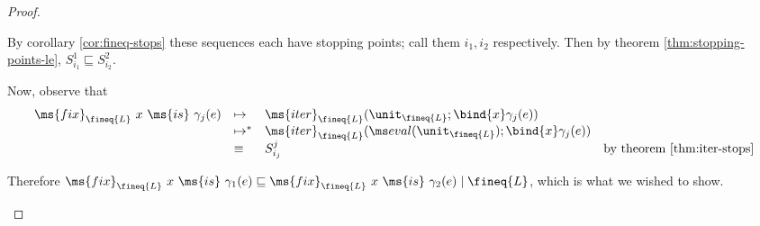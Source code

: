 \documentclass{article}
\newcommand{\ale}{\sqsubseteq}
\newcommand{\tfix}[2]{\ms{fix}_{#1}~{#2}~\ms{is}~}
\newcommand{\iter}[4]{\ms{iter}_{#1}({#2}; \bind{#3}#4)}
\newcommand{\step}{\mapsto}
\newcommand{\steps}{\step^*}
\newcommand{\lr}[2]{#2\mathrel{|}#1}
\begin{document}
\begin{proof}
\begin{description}
    By corollary \ref{cor:fineq-stops} these sequences each have stopping
    points; call them $i_1, i_2$ respectively. Then by theorem
    \ref{thm:stopping-points-le}, $S^1_{i_1} \ale S^2_{i_2}$.

    Now, observe that
    \[\begin{array}{rlll}
      \tfix{\fineq{L}}{x}{\gamma_j(e)}
      &\step& \iter{\fineq{L}}{\unit_{\fineq{L}}}{x}{\gamma_j(e)}\\
      &\steps& \iter{\fineq{L}}{\evalfn(\unit_{\fineq{L}})}{x}{\gamma_j(e)}\\
      &\equiv& S_{i_j}^j & \text{by theorem \ref{thm:iter-stops}}
    \end{array}\]

    Therefore $\lr{\fineq{L}}{\tfix{\fineq{L}}{x}{\gamma_1(e)} \ale
      \tfix{\fineq{L}}{x}{\gamma_2(e)}}$, which is what we wished to show.
  \end{description}
\end{proof}
\end{document}
